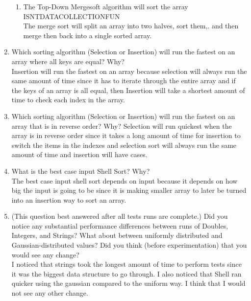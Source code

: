 \documentclass{article}
\begin{document}
\begin{enumerate}
\begin{enumerate}
\item The Top-Down Mergesoft algorithm will sort the array ISNTDATACOLLECTIONFUN
\\
The merge sort will split an array into two halves, sort them,. and then merge then back into a single sorted array.
\end{enumerate}
\item Which sorting algorithm (Selection or Insertion) will run the fastest on an array where all keys are equal? Why?
\\
Insertion will run the fastest on an array because selection will always run the same amount of time since it has to iterate through the entire array and if the keys of an array is all equal, then Insertion will take a shortest amount of time to check each index in the array.
\item Which sorting algorithm (Selection or Insertion) will run the fastest on an array that is in reverse order? Why?
Selection will run quickest when the array is in reverse order since it takes a long amount of time for insertion to switch the items in the indexes and selection sort will always run the same amount of time and insertion will have cases.
\item What is the best case input Shell Sort? Why?
\\
The best case input shell sort depends on input because it depends on how big the input is going to be since it is making smaller array to later be turned into an insertion way to sort an array. 
\item (This question best answered after all tests runs are complete.) Did you notice any substantial performance differences between runs of Doubles, Integers, and Strings? What about between uniformly distributed and Gaussian-distributed values? Did you think (before experimentation) that you would see any change?
\\
I noticed that strings took the longest amount of time to perform tests since it was the biggest data structure to go through.
I also noticed that Shell ran quicker using the gaussian compared to the uniform way.  I think that I would not see any other change.
\end{enumerate}
\end{document}
